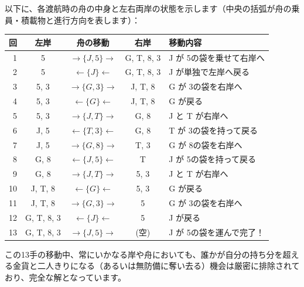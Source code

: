 \documentclass[10pt,a4paper,oneside,openany]{ltjsbook}
\begin{document}
\begin{tcolorbox}[colback=softblue,colframe=primaryblue,title=\textbf{第 374 問：アクス川の渡河パズル（宝物を運ぶ三人の男） （原題: CROSSING THE RIVER AXE.）},arc=2mm,boxrule=1pt,breakable]
以下に、各渡航時の舟の中身と左右両岸の状態を示します（中央の括弧が舟の乗員・積載物と進行方向を表します）：
\begin{center}
\small
\begin{tabular}{rcccl}
\toprule
回 & 左岸 & 舟の移動 & 右岸 & 移動内容 \\
\midrule
1 & 5 & $\rightarrow \{J, 5\} \rightarrow$ & G, T, 8, 3 & J が 5の袋を乗せて右岸へ \\
2 & 5 & $\leftarrow \{J\} \leftarrow$ & G, T, 8, 3 & J が単独で左岸へ戻る \\
3 & 5, 3 & $\rightarrow \{G, 3\} \rightarrow$ & J, T, 8 & G が 3の袋を右岸へ \\
4 & 5, 3 & $\leftarrow \{G\} \leftarrow$ & J, T, 8 & G が戻る \\
5 & 5, 3 & $\rightarrow \{J, T\} \rightarrow$ & G, 8 & J と T が右岸へ \\
6 & J, 5 & $\leftarrow \{T, 3\} \leftarrow$ & G, 8 & T が 3の袋を持って戻る \\
7 & J, 5 & $\rightarrow \{G, 8\} \rightarrow$ & T, 3 & G が 8の袋を右岸へ \\
8 & G, 8 & $\leftarrow \{J, 5\} \leftarrow$ & T & J が 5の袋を持って戻る \\
9 & G, 8 & $\rightarrow \{J, T\} \rightarrow$ & 5, 3 & J と T が右岸へ \\
10 & J, T, 8 & $\leftarrow \{G\} \leftarrow$ & 5, 3 & G が戻る \\
11 & J, T, 8 & $\rightarrow \{G, 3\} \rightarrow$ & 5 & G が 3の袋を右岸へ \\
12 & G, T, 8, 3 & $\leftarrow \{J\} \leftarrow$ & 5 & J が戻る \\
13 & G, T, 8, 3 & $\rightarrow \{J, 5\} \rightarrow$ & (空) & J が 5の袋を運んで完了！ \\
\bottomrule
\end{tabular}
\end{center}

この13手の移動中、常にいかなる岸や舟においても、誰かが自分の持ち分を超える金貨と二人きりになる（あるいは無防備に奪い去る）機会は厳密に排除されており、完全な解となっています。
\end{tcolorbox}
\end{document}

